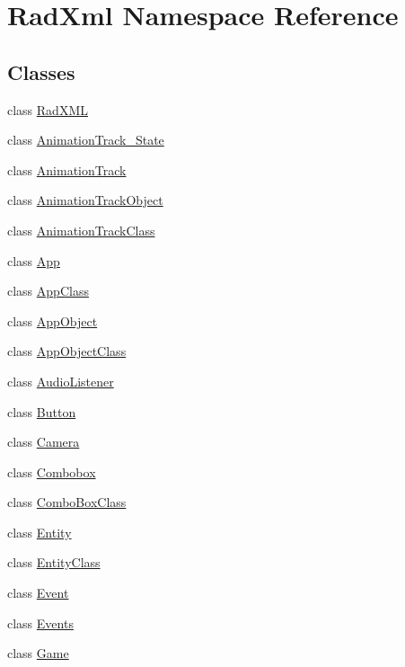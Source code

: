 \hypertarget{namespace_rad_xml}{\section{Rad\-Xml Namespace Reference}
\label{namespace_rad_xml}
}
\subsection*{Classes}
\begin{DoxyCompactItemize}
\item 
class \hyperlink{class_rad_xml_1_1_rad_x_m_l}{Rad\-X\-M\-L}
\item 
class \hyperlink{class_rad_xml_1_1_animation_track___state}{Animation\-Track\-\_\-\-State}
\item 
class \hyperlink{class_rad_xml_1_1_animation_track}{Animation\-Track}
\item 
class \hyperlink{class_rad_xml_1_1_animation_track_object}{Animation\-Track\-Object}
\item 
class \hyperlink{class_rad_xml_1_1_animation_track_class}{Animation\-Track\-Class}
\item 
class \hyperlink{class_rad_xml_1_1_app}{App}
\item 
class \hyperlink{class_rad_xml_1_1_app_class}{App\-Class}
\item 
class \hyperlink{class_rad_xml_1_1_app_object}{App\-Object}
\item 
class \hyperlink{class_rad_xml_1_1_app_object_class}{App\-Object\-Class}
\item 
class \hyperlink{class_rad_xml_1_1_audio_listener}{Audio\-Listener}
\item 
class \hyperlink{class_rad_xml_1_1_button}{Button}
\item 
class \hyperlink{class_rad_xml_1_1_camera}{Camera}
\item 
class \hyperlink{class_rad_xml_1_1_combobox}{Combobox}
\item 
class \hyperlink{class_rad_xml_1_1_combo_box_class}{Combo\-Box\-Class}
\item 
class \hyperlink{class_rad_xml_1_1_entity}{Entity}
\item 
class \hyperlink{class_rad_xml_1_1_entity_class}{Entity\-Class}
\item 
class \hyperlink{class_rad_xml_1_1_event}{Event}
\item 
class \hyperlink{class_rad_xml_1_1_events}{Events}
\item 
class \hyperlink{class_rad_xml_1_1_game}{Game}

\end{DoxyCompactItemize}
